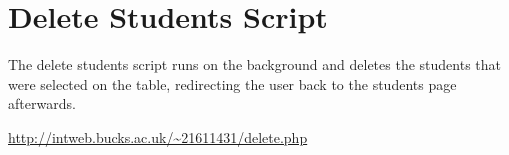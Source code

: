 \chapter{Delete Students Script}
The delete students script runs on the background and deletes the students that were selected on the table, redirecting the user back to the students page afterwards.

\url{http://intweb.bucks.ac.uk/~21611431/delete.php}
\captionsetup{type=figure}

